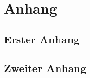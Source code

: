 \appendix
\chapter{Anhang}
	\rohead{\rightmark}
	\section{Erster Anhang}
	\blindtext
	\section{Zweiter Anhang}
	\blindtext
